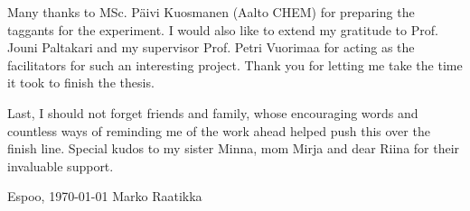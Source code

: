 \documentclass[12pt,a4paper,oneside,pdftex]{report}
\newcommand{\DATE}{\today}
\newcommand{\AUTHOR}{Marko Raatikka}
\begin{document}
Many thanks to MSc. Päivi Kuosmanen (Aalto CHEM) for preparing the taggants for the experiment. I would also like to extend my gratitude to Prof. Jouni Paltakari and my supervisor Prof. Petri Vuorimaa for acting as the facilitators for such an interesting project. Thank you for letting me take the time it took to finish the thesis.

Last, I should not forget friends and family, whose encouraging words and countless ways of reminding me of the work ahead helped push this over the finish line. Special kudos to my sister Minna, mom Mirja and dear Riina for their invaluable support.

\vskip 10mm

\noindent Espoo, \DATE
\vskip 5mm
\noindent\AUTHOR

\cleardoublepage




\cleardoublepage

\begingroup
\makeatletter
\def\@makeschapterhead#1{%
  {\parindent \z@ \raggedright
    \normalfont
    \interlinepenalty\@M
    \Huge \bfseries  #1\par\nobreak
    \vskip 40\p@
  }}
\makeatother

\tableofcontents
\endgroup


\cleardoublepage
\listoffigures
\end{document}
